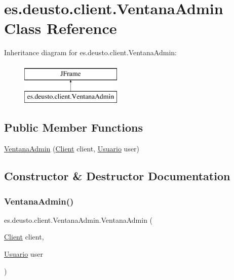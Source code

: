 \hypertarget{classes_1_1deusto_1_1client_1_1_ventana_admin}{}\section{es.\+deusto.\+client.\+Ventana\+Admin Class Reference}
\label{classes_1_1deusto_1_1client_1_1_ventana_admin}
Inheritance diagram for es.\+deusto.\+client.\+Ventana\+Admin\+:\begin{figure}[H]
\begin{center}
\leavevmode
\includegraphics[height=2.000000cm]{classes_1_1deusto_1_1client_1_1_ventana_admin}
\end{center}
\end{figure}
\subsection*{Public Member Functions}
\begin{DoxyCompactItemize}
\item 
\mbox{\hyperlink{classes_1_1deusto_1_1client_1_1_ventana_admin_a227953608a252f1fc239c3392163f3f4}{Ventana\+Admin}} (\mbox{\hyperlink{classes_1_1deusto_1_1client_1_1_client}{Client}} client, \mbox{\hyperlink{classes_1_1deusto_1_1server_1_1jdo_1_1_usuario}{Usuario}} user)
\end{DoxyCompactItemize}


\subsection{Constructor \& Destructor Documentation}
\mbox{\label{classes_1_1deusto_1_1client_1_1_ventana_admin_a227953608a252f1fc239c3392163f3f4}} 
\subsubsection{\texorpdfstring{VentanaAdmin()}{VentanaAdmin()}}
{\footnotesize\ttfamily es.\+deusto.\+client.\+Ventana\+Admin.\+Ventana\+Admin (\begin{DoxyParamCaption}\item[{\mbox{\hyperlink{classes_1_1deusto_1_1client_1_1_client}{Client}}}]{client,  }\item[{\mbox{\hyperlink{classes_1_1deusto_1_1server_1_1jdo_1_1_usuario}{Usuario}}}]{user }\end{DoxyParamCaption})}



